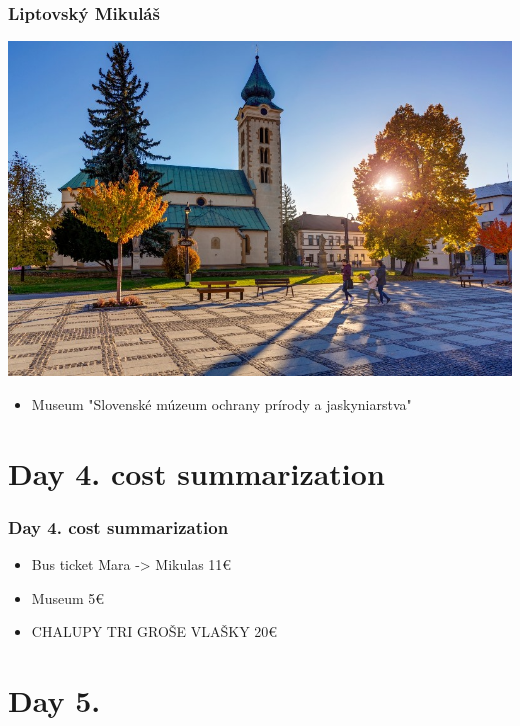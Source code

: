 \documentclass{beamer}
\begin{document}
	\begin{frame}
		\frametitle{Liptovský Mikuláš}
		\includegraphics[width=\textwidth]{day4/mikulas}

		\pause
		\begin{itemize}
			\item Museum "Slovenské múzeum ochrany prírody a jaskyniarstva"
		\end{itemize}
	\end{frame}

	\section{Day 4. cost summarization}
	\begin{frame}
		\frametitle{Day 4. cost summarization}

		\begin{itemize}
			\item Bus ticket Mara -> Mikulas 11€
			\item Museum 5€
			\item CHALUPY TRI GROŠE VLAŠKY 20€
		\end{itemize}
	\end{frame}


	\section{Day 5.}
\end{document}
